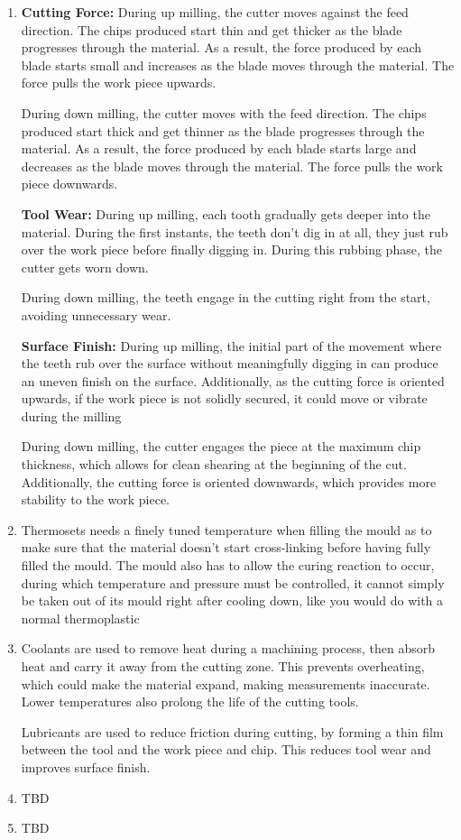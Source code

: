 \documentclass[11pt,letterpaper]{article}
\begin{document}
\begin{enumerate}[label=(\alph*), leftmargin=2.5em, itemsep=0.8em, topsep=0.5em]
\item 
\textbf{Cutting Force:} During up milling, the cutter moves against the feed direction. The chips produced start thin and get thicker as the blade progresses through the material. As a result, the force produced by each blade starts small and increases as the blade moves through the material. The force pulls the work piece upwards.

During down milling, the cutter moves with the feed direction. The chips produced start thick and get thinner as the blade progresses through the material. As a result, the force produced by each blade starts large and decreases as the blade moves through the material. The force pulls the work piece downwards.

\textbf{Tool Wear:} During up milling, each tooth gradually gets deeper into the material. During the first instants, the teeth don't dig in at all, they just rub over the work piece before finally digging in. During this rubbing phase, the cutter gets worn down.

During down milling, the teeth engage in the cutting right from the start, avoiding unnecessary wear.

\textbf{Surface Finish:} During up milling, the initial part of the movement where the teeth rub over the surface without meaningfully digging in can produce an uneven finish on the surface. Additionally, as the cutting force is oriented upwards, if the work piece is not solidly secured, it could move or vibrate during the milling

During down milling, the cutter engages the piece at the maximum chip thickness, which allows for clean shearing at the beginning of the cut. Additionally, the cutting force is oriented downwards, which provides more stability to the work piece.

\item Thermosets needs a finely tuned temperature when filling the mould as to make sure that the material doesn't start cross-linking before having fully filled the mould. The mould also has to allow the curing reaction to occur, during which temperature and pressure must be controlled, it cannot simply be taken out of its mould right after cooling down, like you would do with a normal thermoplastic


\item Coolants are used to remove heat during a machining process, then absorb heat and carry it away from the cutting zone. This prevents overheating, which could make the material expand, making measurements inaccurate. Lower temperatures also prolong the life of the cutting tools.

Lubricants are used to reduce friction during cutting, by forming a thin film between the tool and the work piece and chip. This reduces tool wear and improves surface finish.

\item TBD
\item TBD

\end{enumerate}
\end{document}
